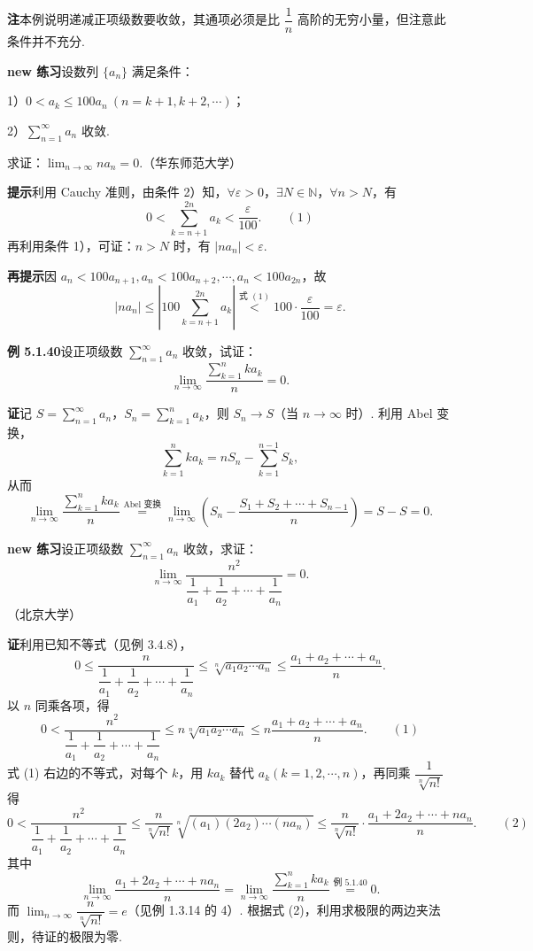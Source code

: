 \documentclass[UTF8, 12pt, fontset=fandol, oneside]{ctexart}
\begin{document}
\noindent\textbf{注}\quad 本例说明递减正项级数要收敛，其通项必须是比 $\dfrac1n$ 高阶的无穷小量，但注意此条件并不充分.

\noindent\textbf{new 练习}\quad 设数列 $\{a_n\}$ 满足条件：

1）$0<a_k\le100a_n\ (n=k+1,k+2,\cdots)$；

2）$\displaystyle\sum_{n=1}^{\infty}a_n$ 收敛.

求证：$\displaystyle\lim_{n\to\infty}na_n=0$.（华东师范大学）

\noindent\textbf{提示}\quad 利用 Cauchy 准则，由条件 2）知，$\forall\varepsilon>0$，$\exists N\in\mathbb N$，$\forall n>N$，有
\[
  0<\sum_{k=n+1}^{2n}a_k<\frac{\varepsilon}{100}.
\qquad(1)
\]
再利用条件 1），可证：$n>N$ 时，有 $|na_n|<\varepsilon$.

\noindent\textbf{再提示}\quad 因 $a_n<100a_{n+1},a_n<100a_{n+2},\cdots,a_n<100a_{2n}$，故
\[
  |na_n|\le\left|100\sum_{k=n+1}^{2n}a_k\right|
  \stackrel{\text{式 }(1)}{<}100\cdot\frac{\varepsilon}{100}=\varepsilon.
\]

\noindent\textbf{例 5.1.40}\quad 设正项级数 $\displaystyle\sum_{n=1}^{\infty}a_n$ 收敛，试证：
\[
  \lim_{n\to\infty}\frac{\sum_{k=1}^n ka_k}{n}=0.
\]

\noindent\textbf{证}\quad 记 $S=\displaystyle\sum_{n=1}^{\infty}a_n$，$S_n=\displaystyle\sum_{k=1}^n a_k$，则 $S_n\to S$（当 $n\to\infty$ 时）. 利用 Abel 变换，
\[
  \sum_{k=1}^n ka_k=nS_n-\sum_{k=1}^{n-1}S_k,
\]
从而
\[
  \lim_{n\to\infty}\frac{\sum_{k=1}^n ka_k}{n}
  \stackrel{\text{Abel 变换}}{=}
  \lim_{n\to\infty}\left(S_n-\frac{S_1+S_2+\cdots+S_{n-1}}n\right)
  =S-S=0.
\]

\noindent\textbf{new 练习}\quad 设正项级数 $\displaystyle\sum_{n=1}^{\infty}a_n$ 收敛，求证：
\[
  \lim_{n\to\infty}\frac{n^2}{\dfrac1{a_1}+\dfrac1{a_2}+\cdots+\dfrac1{a_n}}=0.
\]
（北京大学）

\noindent\textbf{证}\quad 利用已知不等式（见例 3.4.8），
\[
  0\le\frac{n}{\dfrac1{a_1}+\dfrac1{a_2}+\cdots+\dfrac1{a_n}}
  \le\sqrt[n]{a_1a_2\cdots a_n}\le\frac{a_1+a_2+\cdots+a_n}{n}.
\]
以 $n$ 同乘各项，得
\[
  0<\frac{n^2}{\dfrac1{a_1}+\dfrac1{a_2}+\cdots+\dfrac1{a_n}}
  \le n\sqrt[n]{a_1a_2\cdots a_n}
  \le n\frac{a_1+a_2+\cdots+a_n}{n}.
\qquad(1)
\]
式 (1) 右边的不等式，对每个 $k$，用 $ka_k$ 替代 $a_k(k=1,2,\cdots,n)$，再同乘 $\dfrac1{\sqrt[n]{n!}}$ 得
\[
  0<\frac{n^2}{\dfrac1{a_1}+\dfrac1{a_2}+\cdots+\dfrac1{a_n}}
  \le\frac n{\sqrt[n]{n!}}\sqrt[n]{(a_1)(2a_2)\cdots(na_n)}
  \le\frac n{\sqrt[n]{n!}}\cdot\frac{a_1+2a_2+\cdots+na_n}{n}.
\qquad(2)
\]
其中
\[
  \lim_{n\to\infty}\frac{a_1+2a_2+\cdots+na_n}{n}
  =\lim_{n\to\infty}\frac{\sum_{k=1}^nka_k}{n}
  \stackrel{\text{例 5.1.40}}{=}0.
\]
而 $\displaystyle\lim_{n\to\infty}\dfrac n{\sqrt[n]{n!}}=e$（见例 1.3.14 的 4）. 根据式 (2)，利用求极限的两边夹法则，待证的极限为零.
\end{document}
